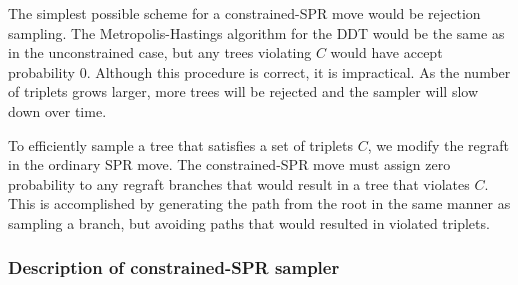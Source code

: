 %


The simplest possible scheme for a constrained-SPR move 
would be rejection sampling. The Metropolis-Hastings
algorithm for the DDT would be the same as in the
unconstrained case,
but any trees violating $C$ would have accept
probability $0$. Although this procedure is correct,
it is impractical. As the number of triplets
grows larger, more trees will be rejected
and the sampler will slow down over time.

To efficiently sample a tree that satisfies a set of triplets $C$, 
we modify the regraft in the ordinary SPR move. 
The constrained-SPR move must assign zero probability
to any regraft branches that would result in a tree
that violates $C$.
This is accomplished by generating the path from the root
in the same manner as sampling a branch,
but avoiding paths that would resulted in violated triplets.


\subsubsection*{Description of constrained-SPR sampler}


